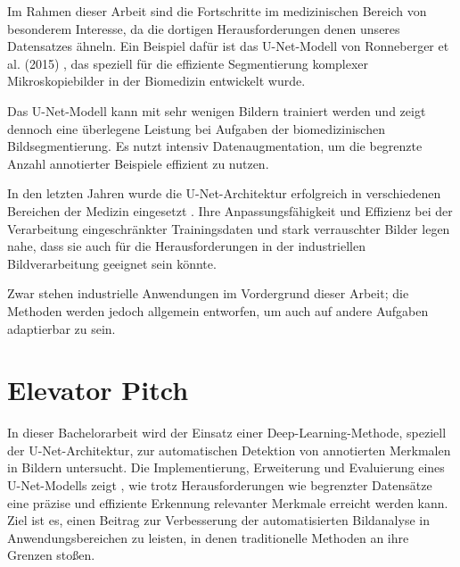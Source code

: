 Im Rahmen dieser Arbeit sind die Fortschritte im medizinischen Bereich von besonderem Interesse, da die dortigen Herausforderungen denen unseres Datensatzes ähneln. Ein Beispiel dafür ist das U-Net-Modell von Ronneberger et al. (2015) \cite{ronneberger_u-net_2015}, das speziell für die effiziente Segmentierung komplexer Mikroskopiebilder in der Biomedizin entwickelt wurde.

Das U-Net-Modell kann mit sehr wenigen Bildern trainiert werden und zeigt dennoch eine überlegene Leistung bei Aufgaben der biomedizinischen Bildsegmentierung. Es nutzt intensiv Datenaugmentation, um die begrenzte Anzahl annotierter Beispiele effizient zu nutzen.

In den letzten Jahren wurde die U-Net-Architektur erfolgreich in verschiedenen Bereichen der Medizin eingesetzt \cite{azad_medical_2024, siddique_u-net_2021}. Ihre Anpassungsfähigkeit und Effizienz bei der Verarbeitung eingeschränkter Trainingsdaten und stark verrauschter Bilder legen nahe, dass sie auch für die Herausforderungen in der industriellen Bildverarbeitung geeignet sein könnte.

Zwar stehen industrielle Anwendungen im Vordergrund dieser Arbeit; die Methoden werden jedoch allgemein entworfen, um auch auf andere Aufgaben adaptierbar zu sein.

\section{Elevator Pitch}\label{sec:exp_elevator}
In dieser Bachelorarbeit wird der Einsatz einer Deep-Learning-Methode, speziell der U-Net-Architektur, zur automatischen Detektion von annotierten Merkmalen in Bildern untersucht. Die Implementierung, Erweiterung und Evaluierung eines U-Net-Modells zeigt , wie trotz Herausforderungen wie begrenzter Datensätze eine präzise und effiziente Erkennung relevanter Merkmale erreicht werden kann. Ziel ist es, einen Beitrag zur Verbesserung der automatisierten Bildanalyse in Anwendungsbereichen zu leisten, in denen traditionelle Methoden an ihre Grenzen stoßen.